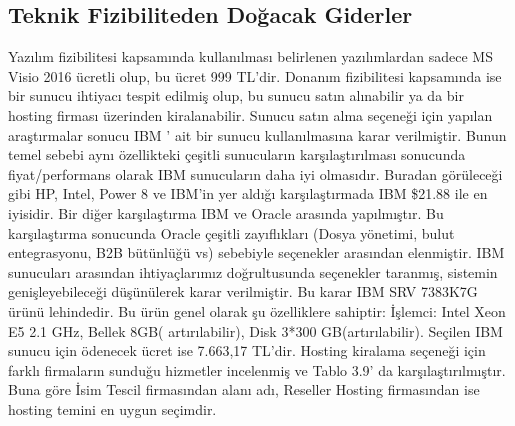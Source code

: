 \subsection{Teknik Fizibiliteden Doğacak Giderler}
Yazılım fizibilitesi kapsamında kullanılması belirlenen yazılımlardan sadece MS Visio
2016 ücretli olup, bu ücret 999 TL’dir\cite{visio}.
Donanım fizibilitesi kapsamında ise bir sunucu ihtiyacı tespit edilmiş olup, bu sunucu
satın alınabilir ya da bir hosting firması üzerinden kiralanabilir.
Sunucu satın alma seçeneği için yapılan araştırmalar sonucu IBM ' ait bir sunucu
kullanılmasına karar verilmiştir. Bunun temel sebebi aynı özellikteki çeşitli sunucuların
karşılaştırılması sonucunda fiyat/performans olarak IBM sunucuların daha iyi olmasıdır.
\cite{ibmKarsilastirma} Buradan görüleceği gibi HP, Intel, Power 8 ve IBM'in yer aldığı karşılaştırmada
IBM \$21.88 ile en iyisidir. Bir diğer karşılaştırma IBM ve Oracle arasında yapılmıştır.
Bu karşılaştırma sonucunda Oracle çeşitli zayıflıkları \cite{ibmvsOracle}(Dosya yönetimi, bulut
entegrasyonu, B2B bütünlüğü vs) sebebiyle seçenekler arasından elenmiştir. IBM
sunucuları arasından ihtiyaçlarımız doğrultusunda seçenekler taranmış, sistemin
genişleyebileceği düşünülerek karar verilmiştir. Bu karar IBM SRV 7383K7G ürünü
lehindedir. Bu ürün genel olarak şu özelliklere sahiptir: İşlemci: Intel Xeon E5 2.1 GHz,
Bellek 8GB( artırılabilir), Disk 3*300 GB(artırılabilir)\cite{ibmFiyat}. Seçilen IBM sunucu için
ödenecek ücret ise 7.663,17 TL'dir\cite{ibmFiyat}.
Hosting kiralama seçeneği için farklı firmaların sunduğu hizmetler incelenmiş ve Tablo
3.9’ da karşılaştırılmıştır. Buna göre İsim Tescil firmasından alanı adı, Reseller Hosting
firmasından ise hosting temini en uygun seçimdir.

